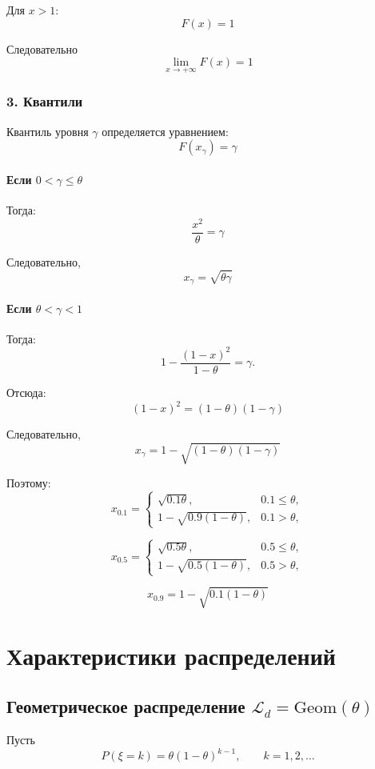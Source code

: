 \documentclass[12pt,a4paper]{article}
\theoremstyle{definition}
\begin{document}
Для $x>1$:
\[F(x)=1\]

Следовательно
\[\lim_{x\to+\infty}F(x)=1\]

\subsubsection*{3. Квантили}

Квантиль уровня $\gamma$ определяется уравнением:
\[F(x_\gamma)=\gamma\]

\paragraph{Если $0<\gamma\le\theta$}

Тогда:
\[\frac{x^2}{\theta}=\gamma\]

Следовательно,
\[x_\gamma=\sqrt{\theta\gamma}\]

\paragraph{Если $\theta<\gamma<1$}
Тогда:
\[1-\frac{(1-x)^2}{1-\theta}=\gamma.\]

Отсюда:
\[(1-x)^2=(1-\theta)(1-\gamma)\]

Следовательно,
\[x_\gamma=1-\sqrt{(1-\theta)(1-\gamma)}\]

Поэтому:
\[x_{0.1}=\begin{cases}\sqrt{0.1\theta}, & 0.1\le\theta,\\[1ex]1-\sqrt{0.9(1-\theta)}, & 0.1>\theta,\end{cases}\]

\[
x_{0.5}=
\begin{cases}
\sqrt{0.5\theta}, & 0.5\le\theta,\\[1ex]
1-\sqrt{0.5(1-\theta)}, & 0.5>\theta,
\end{cases}
\]

\[x_{0.9}=1-\sqrt{0.1(1-\theta)}\]

\section{Характеристики распределений}

\subsection{\texorpdfstring
{Геометрическое распределение $\mathscr{L}_d=\mathrm{Geom}(\theta)$}
{Геометрическое распределение Ld = Geom(theta)}}

Пусть
\[P(\xi=k)=\theta(1-\theta)^{k-1},\qquad k=1,2,\dots\]
\end{document}
